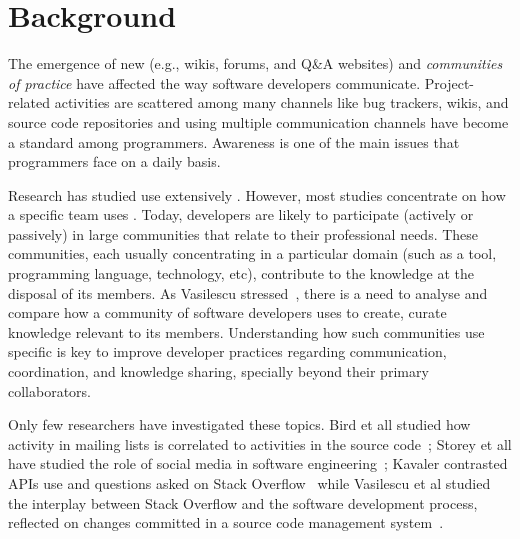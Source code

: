\section{Background}
\label{cha:background}

The emergence of new \textit{\channels} (e.g., wikis, forums, and Q\&A websites) and \textit{communities of practice} have affected the way
    software developers communicate.
    Project-related activities are scattered among many channels like bug trackers, wikis, and source code repositories and
    using multiple communication channels have become a standard among programmers. 
    Awareness is one of the main issues that programmers face on a daily basis.

    Research has studied \channels use extensively \cite{Pal2011a,Pal2012a, Jin2013, Jiang2013,German2013,Sowe2008a, Singh2009, Parnin2013}.  However, most studies concentrate on how a specific team uses \channels. Today, developers are likely to participate (actively or passively)
    in large communities that relate to their professional needs. These communities, each usually concentrating in a particular domain (such as a tool,
    programming language, technology, etc), contribute to the knowledge at the disposal of its members.  As Vasilescu stressed~\cite{Vasilescu2014b}, there is a need to analyse and compare how a community
    of software developers uses \channels to create, curate knowledge relevant to its members. Understanding how such communities use specific \channels is
    key to improve developer practices regarding communication, coordination, and knowledge sharing, specially beyond their primary collaborators.

    Only few researchers have investigated these topics.  Bird et all studied how activity in mailing lists is correlated to activities in the source
    code~\cite{Bird2006}; Storey et all have studied the role of social media in software engineering~\cite{Storey2014, Storey2010}; Kavaler contrasted APIs use
    and questions asked on Stack Overflow~\cite{Kavaler2013} while Vasilescu et al studied the interplay between Stack Overflow and the software development
    process, reflected on changes committed in a source code management system~\cite{Vasilescu2013a}.

\subsection{\Channel}


